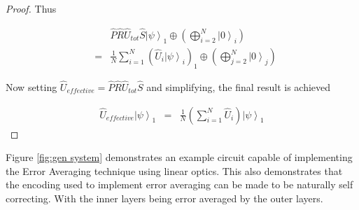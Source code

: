 \documentclass[aps,pra,twocolumn,superscriptaddress,numerical]{revtex4-1}
\begin{document}
\begin{proof}
		Thus
		
		\begin{eqnarray}
			& & \hat{P}\hat{R}\hat{U}_{tot}\hat{S}\left|\psi\right\rangle_{1}\oplus\left(\bigoplus_{i=2}^{N}\left|0\right\rangle_{i}\right) \\
			&=& \frac{1}{N}\sum_{i=1}^{N}\left(\hat{U}_{i}\left|\psi\right\rangle_{i}\right)_{1}\oplus\left(\bigoplus_{j=2}^{N}\left|0\right\rangle_{j}\right) 
		\end{eqnarray}
		
		Now setting $\hat{U}_{effective}=\hat{P}\hat{R}\hat{U}_{tot}\hat{S}$ and simplifying,  the final result is achieved
		
		\begin{eqnarray}
			\hat{U}_{effective} \left|\psi\right\rangle_{1} &=& \frac{1}{N}\left(\sum_{i=1}^{N}\hat{U}_{i}\right)\left|\psi\right\rangle_{1}
		\end{eqnarray}		
	\end{proof}
	
	Figure \ref{fig:gen system} demonstrates an example circuit capable of implementing the Error Averaging technique using linear optics. This also demonstrates that the encoding used to implement error averaging can be made to be naturally self correcting. With the inner layers being error averaged by the outer layers.
	
\end{document}
